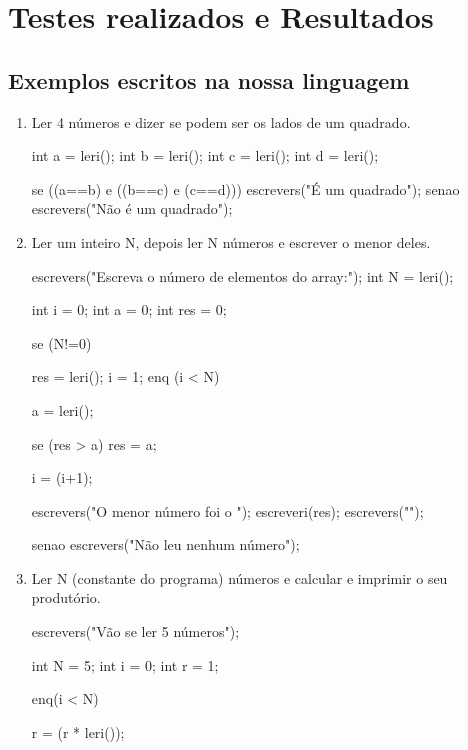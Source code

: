 \documentclass{report}
\begin{document}
\section{Testes realizados e Resultados}
\subsection{Exemplos escritos na nossa linguagem}

\begin{enumerate}
	\item Ler 4 números e dizer se podem ser os lados de um quadrado.\\
	
	\begin{code}
	int a = leri();
	int b = leri();
	int c = leri();
	int d = leri();
	
	se ((a==b) e ((b==c) e (c==d))) {
		escrevers("É um quadrado\n");
	}
	senao {
		escrevers("Não é um quadrado\n");
	}
	\end{code}	
	
	\item Ler um inteiro N, depois ler N números e escrever o menor deles.\\
	
	\begin{code}
		escrevers("Escreva o número de elementos do array:\n");
		int N = leri();
		
		int i = 0;
		int a = 0;
		int res = 0;
		
		se (N!=0){
			res = leri();
			i = 1;
			enq (i < N){
				a = leri();
				
				se (res > a){
					res = a;
				}
				
				i = (i+1);
			}
			
			
			escrevers("O menor número foi o ");
			escreveri(res);
			escrevers("\n");
			
		}
		senao{
			escrevers("Não leu nenhum número\n");
		}
	\end{code}
	
	\item Ler N (constante do programa) números e calcular e imprimir o seu produtório.\\
	
	\begin{code}
		escrevers("Vão se ler 5 números\n");
		
		int N = 5;
		int i = 0;
		int r = 1;
		
		enq(i < N){
			
			r = (r * leri());
			
}
\end{code}
\end{enumerate}
\end{document}
